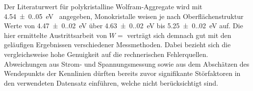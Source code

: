 Der Literaturwert für polykristalline Wolfram-Aggregate wird mit \qty{4.54(0.05)}{\electronvolt}~\cite{hop_riv_work_function}
angegeben, Monokristalle weisen je nach Oberflächenstruktur Werte von \qty{4.47(0.02)}{\electronvolt} über
\qty{4.63(0.02)}{\electronvolt} bis \qty{5.25(0.02)}{\electronvolt} \cite{str_mac_swa_work_function} auf.
Die hier ermittelte Austrittsarbeit von $W = $ verträgt sich demnach gut mit den geläufigen
Ergebnissen verschiedener Messmethoden. Dabei bezieht sich die vergleichsweise hohe Genuigkeit auf die rechnerischen
Fehlerquellen. Abweichungen aus Strom- und Spannungsmessung sowie aus dem Abschätzen des Wendepunkts der Kennlinien dürften
bereits zuvor signifikante Störfaktoren in den verwendeten Datensatz einführen, welche nicht berücksichtigt sind.

\vfill
